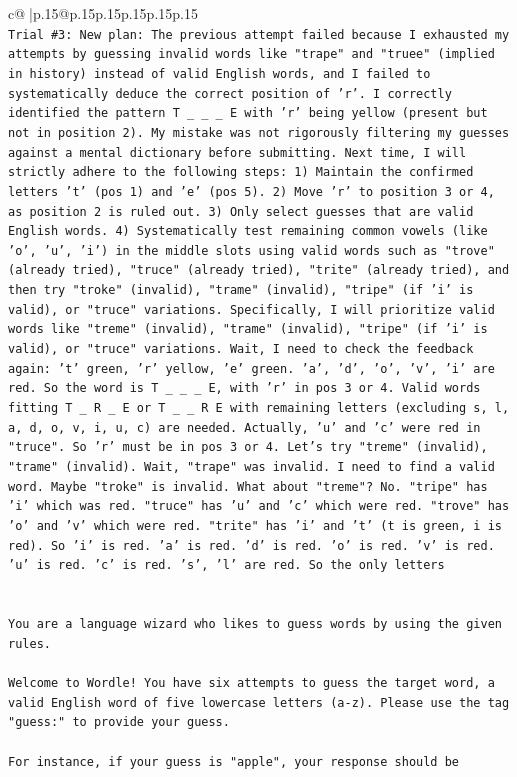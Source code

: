 \documentclass{article}
\begin{document}
{\begin{supertabular}{c@{$\;$}|p{.15\linewidth}@{}p{.15\linewidth}p{.15\linewidth}p{.15\linewidth}p{.15\linewidth}p{.15\linewidth}}
{{{\\ 
\texttt{Trial \#3: New plan: The previous attempt failed because I exhausted my attempts by guessing invalid words like "trape" and "truee" (implied in history) instead of valid English words, and I failed to systematically deduce the correct position of 'r'. I correctly identified the pattern T \_ \_ \_ E with 'r' being yellow (present but not in position 2). My mistake was not rigorously filtering my guesses against a mental dictionary before submitting. Next time, I will strictly adhere to the following steps: 1) Maintain the confirmed letters 't' (pos 1) and 'e' (pos 5). 2) Move 'r' to position 3 or 4, as position 2 is ruled out. 3) Only select guesses that are valid English words. 4) Systematically test remaining common vowels (like 'o', 'u', 'i') in the middle slots using valid words such as "trove" (already tried), "truce" (already tried), "trite" (already tried), and then try "troke" (invalid), "trame" (invalid), "tripe" (if 'i' is valid), or "truce" variations. Specifically, I will prioritize valid words like "treme" (invalid), "trame" (invalid), "tripe" (if 'i' is valid), or "truce" variations. Wait, I need to check the feedback again: 't' green, 'r' yellow, 'e' green. 'a', 'd', 'o', 'v', 'i' are red. So the word is T \_ \_ \_ E, with 'r' in pos 3 or 4. Valid words fitting T \_ R \_ E or T \_ \_ R E with remaining letters (excluding s, l, a, d, o, v, i, u, c) are needed. Actually, 'u' and 'c' were red in "truce". So 'r' must be in pos 3 or 4. Let's try "treme" (invalid), "trame" (invalid). Wait, "trape" was invalid. I need to find a valid word. Maybe "troke" is invalid. What about "treme"? No. "tripe" has 'i' which was red. "truce" has 'u' and 'c' which were red. "trove" has 'o' and 'v' which were red. "trite" has 'i' and 't' (t is green, i is red). So 'i' is red. 'a' is red. 'd' is red. 'o' is red. 'v' is red. 'u' is red. 'c' is red. 's', 'l' are red. So the only letters} \\
\\ 
\\ 
\texttt{You are a language wizard who likes to guess words by using the given rules.} \\
\\ 
\texttt{Welcome to Wordle! You have six attempts to guess the target word, a valid English word of five lowercase letters (a{-}z). Please use the tag "guess:" to provide your guess.} \\
\\ 
\texttt{For instance, if your guess is "apple", your response should be} \\
}}}
\end{supertabular}}
\end{document}
